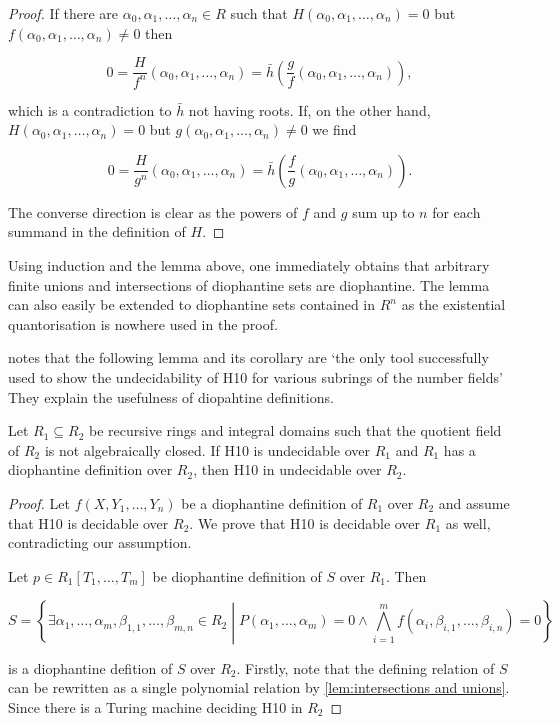 \begin{proof}
If there are $α_0, α_1, …, α_n ∈ R$ such that
$H(α_0, α_1, …, α_n) = 0$ but $f(α_0, α_1, …, α_n) ≠ 0$ then

\[ 0 = \frac H {f^n} (α_0, α_1, …, α_n) = \bar h \left(\frac gf (α_0, α_1, …, α_n) \right), \]

which is a contradiction to $\bar h$ not having roots. If, on the
other hand, $H(α_0, α_1, …, α_n) = 0$ but $g(α_0, α_1, …, α_n) ≠ 0$
we find

\[ 0 = \frac H {g^n}(α_0, α_1, …, α_n) = \bar h \left( \frac fg (α_0, α_1, …, α_n) \right). \]

The converse direction is clear as the powers of $f$ and $g$ sum up
to $n$ for each summand in the definition of $H$.
\end{proof}

Using induction and the lemma above, one immediately obtains that
arbitrary finite unions and intersections of diophantine sets are
diophantine. The lemma can also easily be extended to diophantine sets
contained in $R^n$ as the existential quantorisation is nowhere used
in the proof.

\textcite{Shlapentokh2000} notes that the following lemma and its corollary are
`the only tool successfully used to show the undecidability of \textsc{H10}
for various subrings of the number fields' They explain the usefulness
of diopahtine definitions.

\begin{lem}
Let $R_1 \subseteq R_2$ be recursive rings and integral domains such
that the quotient field of $R_2$ is not algebraically closed. If H10
is undecidable over $R_1$ and $R_1$ has a diophantine definition over
$R_2$, then H10 in undecidable over $R_2$.
\end{lem}

\begin{proof}
Let $f(X, Y_1, …, Y_n)$ be a diophantine definition of $R_1$ over
$R_2$ and assume that H10 is decidable over $R_2$. We prove that H10
is decidable over $R_1$ as well, contradicting our assumption.

Let $p ∈ R_1[T_1, …, T_m]$ be diophantine definition of $S$ over
$R_1$. Then

\[ S = \left\lbrace ∃α_1,…,α_m, β_{1,1}, …, β_{m,n} ∈ R_2 \middle| P(α_1, …, α_m) = 0 ∧ \bigwedge_{i=1}^m f(α_i, β_{i,1},…,β_{i,n}) = 0 \right\rbrace\]

is a diophantine defition of $S$ over $R_2$. Firstly, note that the
defining relation of $S$ can be rewritten as a single polynomial
relation by \cref{lem:intersections and unions}. Since there is
a Turing machine deciding \textsc{H10} in $R_2$
\end{proof}
